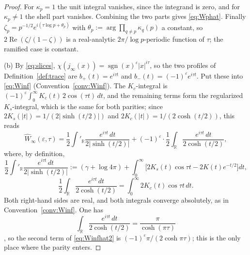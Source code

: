 \documentclass[11pt]{amsart}
\theoremstyle{definition}
\theoremstyle{remark}
\newcommand{\R}{\mathbb R}
\newcommand{\Rel}{\operatorname{Re}}
\newcommand{\sgn}{\operatorname{sgn}}
\newcommand{\Wh}{\widehat{W}}
\begin{document}
\begin{proof}
For $\kappa_p=1$ the unit integral vanishes, since the integrand is zero, and
for $\kappa_p\ne1$ the shell part vanishes.  Combining the two parts gives
\eqref{eq:Wphat}.  Finally
$\zeta_p=p^{-1/2}e^{i(\tau\log p+\theta_p)}$ with
$\theta_p:=\arg\prod_{q\ne p}\kappa_q(p)$ a constant, so
$2\Rel(\zeta/(1-\zeta))$ is a real-analytic $2\pi/\log p$-periodic function of
$\tau$; the ramified case is constant.

(b)  By \eqref{eq:slices}, $\chi(j_{\infty}(x))=\sgn(x)^{\varepsilon}
|x|^{i\tau}$, so the two profiles of Definition~\ref{def:trace} are
$b_{+}(t)=e^{i\tau t}$ and $b_{-}(t)=(-1)^{\varepsilon}e^{i\tau t}$.  Put
these into \eqref{eq:Winf} (Convention~\ref{conv:Winf}).  The $K_{c}$-integral
is $(-1)^{\varepsilon}\int_0^{\infty}K_c(t)\,2\cos(\tau t)\,dt$, and the
remaining terms form the regularized $K_{s}$-integral, which is the same for
both parities; since $2K_{s}(|t|)=1/(2|\sinh(t/2)|)$ and
$2K_{c}(|t|)=1/(2\cosh(t/2))$, this reads
\begin{equation}\label{eq:Winfhat2}
\Wh_{\infty}(\varepsilon,\tau)=\frac12\int'_{\R}
\frac{e^{i\tau t}\,dt}{2|\sinh(t/2)|}
+(-1)^{\varepsilon}\cdot\frac12\int_{\R}\frac{e^{i\tau t}\,dt}{2\cosh(t/2)} ,
\end{equation}
where, by definition,
\[
\frac12\int'_{\R}\frac{e^{i\tau t}\,dt}{2|\sinh(t/2)|}
:=(\gamma+\log4\pi)+\int_0^{\infty}\bigl[2K_{s}(t)\cos\tau t-2K(t)e^{-t/2}\bigr]dt,
\]
\[
\frac12\int_{\R}\frac{e^{i\tau t}\,dt}{2\cosh(t/2)}=\int_0^{\infty}2K_{c}(t)\cos\tau t\,dt .
\]
Both right-hand sides are real, and both integrals converge absolutely, as in
Convention~\ref{conv:Winf}.  One has
\begin{equation}\label{eq:sech}
\int_{\R}\frac{e^{i\tau t}\,dt}{2\cosh(t/2)}=\frac{\pi}{\cosh(\pi\tau)}
\end{equation}
\cite[3.981.3]{GR}, so the second term of \eqref{eq:Winfhat2} is
$(-1)^{\varepsilon}\pi/(2\cosh\pi\tau)$; this is the only place where the
parity enters.


\end{proof}
\end{document}
